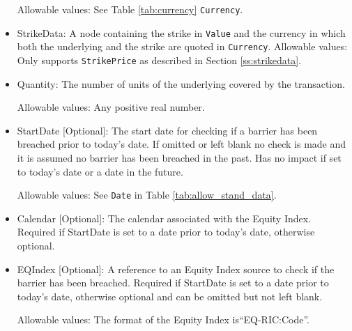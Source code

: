 \begin{itemize}
Allowable values:  See Table \ref{tab:currency} \lstinline!Currency!.   
    
\item StrikeData: A node containing the strike in \lstinline!Value! and the currency in which both the underlying and the strike are quoted in \lstinline!Currency!.
Allowable values: Only supports \lstinline!StrikePrice! as described in Section \ref{ss:strikedata}.
    
\item Quantity: The number of units of the underlying covered by the transaction.
    
Allowable values:  Any positive real number.

\item StartDate [Optional]: The start date for checking if a barrier has been breached prior to
today's date.  If omitted or left blank no check is made and it is assumed no barrier has been
breached in the past. Has no impact if set to today's date or a date in the future.

Allowable values:  See \lstinline!Date! in Table \ref{tab:allow_stand_data}.

\item Calendar [Optional]: The calendar associated with the Equity Index. Required if StartDate is set to a date prior to today's date, otherwise optional.

\item EQIndex [Optional]: A reference to an Equity Index source to check if the barrier has been breached. Required if StartDate is set to a date prior to today's date, otherwise optional and can be omitted but not left blank.

Allowable values:  The format of the Equity Index is``EQ-RIC:Code''.

\end{itemize}